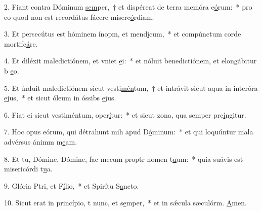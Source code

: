 2. Fiant contra Dóminum \uline{sem}per,~† et dispéreat de terra memóra e\uline{ó}rum:~* pro eo quod non est recordátus fácere miserc\uline{ó}rdiam.\par 
3. Et persecútus est hóminem ínopm, et mend\uline{í}cum,~* et compúnctum corde mortifc\uline{á}re.\par 
4. Et diléxit maledictiónem, et vniet \uline{e}i:~* et nóluit benedictiónem, et elongábitur b \uline{e}o.\par 
5. Et índuit maledictiónem sicut vesti\uline{mén}tum,~† et intrávit sicut aqua in interóra \uline{e}jus,~* et sicut óleum in óssibs \uline{e}jus.\par 
6. Fiat ei sicut vestiméntum,  oper\uline{í}tur:~* et sicut zona, qua semper prc\uline{í}ngitur.\par 
7. Hoc opus eórum, qui détrahunt mih apud D\uline{ó}minum:~* et qui loquúntur mala advérsus ánimm m\uline{e}am.\par 
8. Et tu, Dómine, Dómine, fac mecum proptr nomen t\uline{u}um:~* quia suávis est misericórdi t\uline{u}a.\par 
9. Glória Ptri, et F\uline{í}lio,~* et Spirítu S\uline{a}ncto.\par 
10. Sicut erat in princípio, t nunc, et s\uline{e}mper,~* et in sǽcula sæculórm. \uline{A}men.\par 
